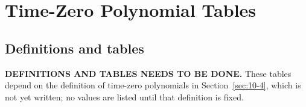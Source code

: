 \chapter{Time-Zero Polynomial Tables}
\section{Definitions and tables}

\noindent\textbf{DEFINITIONS AND TABLES NEEDS TO BE DONE.} These tables depend on the definition of time-zero polynomials in Section~\ref{sec:10-4}, which is not yet written; no values are listed until that definition is fixed.


